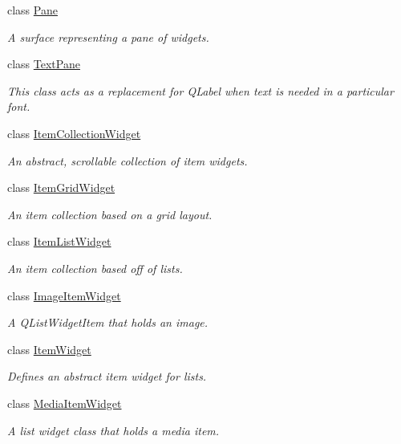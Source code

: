 \begin{DoxyCompactItemize}
class \hyperlink{class_u_i_1_1_pane}{Pane}
\begin{DoxyCompactList}\small\item\em A surface representing a pane of widgets. \end{DoxyCompactList}\item 
class \hyperlink{class_u_i_1_1_text_pane}{Text\-Pane}
\begin{DoxyCompactList}\small\item\em This class acts as a replacement for {\ttfamily Q\-Label} when text is needed in a particular font. \end{DoxyCompactList}\item 
class \hyperlink{class_u_i_1_1_item_collection_widget}{Item\-Collection\-Widget}
\begin{DoxyCompactList}\small\item\em An abstract, scrollable collection of item widgets. \end{DoxyCompactList}\item 
class \hyperlink{class_u_i_1_1_item_grid_widget}{Item\-Grid\-Widget}
\begin{DoxyCompactList}\small\item\em An item collection based on a grid layout. \end{DoxyCompactList}\item 
class \hyperlink{class_u_i_1_1_item_list_widget}{Item\-List\-Widget}
\begin{DoxyCompactList}\small\item\em An item collection based off of lists. \end{DoxyCompactList}\item 
class \hyperlink{class_u_i_1_1_image_item_widget}{Image\-Item\-Widget}
\begin{DoxyCompactList}\small\item\em A {\ttfamily Q\-List\-Widget\-Item} that holds an image. \end{DoxyCompactList}\item 
class \hyperlink{class_u_i_1_1_item_widget}{Item\-Widget}
\begin{DoxyCompactList}\small\item\em Defines an abstract item widget for lists. \end{DoxyCompactList}\item 
class \hyperlink{class_u_i_1_1_media_item_widget}{Media\-Item\-Widget}
\begin{DoxyCompactList}\small\item\em A list widget class that holds a media item. \end{DoxyCompactList}\item 

\end{DoxyCompactItemize}
